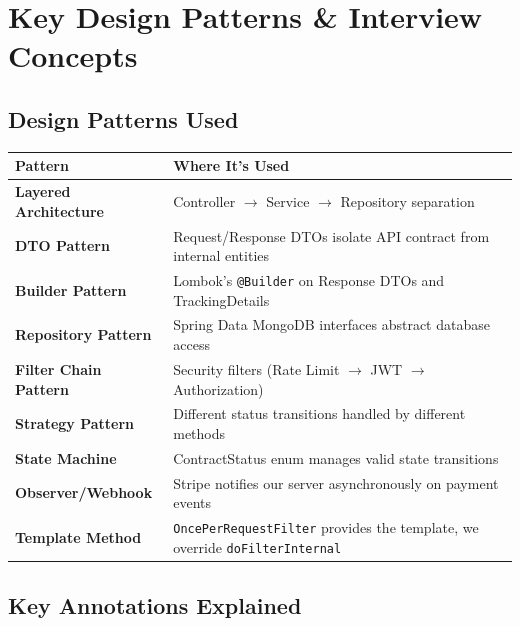 \documentclass[11pt, a4paper]{article}
\begin{document}
\section{Key Design Patterns \& Interview Concepts}

\subsection{Design Patterns Used}

\begin{longtable}{@{}lp{9cm}@{}}
\toprule
\textbf{Pattern} & \textbf{Where It's Used} \\
\midrule
\textbf{Layered Architecture} & Controller $\rightarrow$ Service $\rightarrow$ Repository separation \\
\textbf{DTO Pattern} & Request/Response DTOs isolate API contract from internal entities \\
\textbf{Builder Pattern} & Lombok's \texttt{@Builder} on Response DTOs and TrackingDetails \\
\textbf{Repository Pattern} & Spring Data MongoDB interfaces abstract database access \\
\textbf{Filter Chain Pattern} & Security filters (Rate Limit $\rightarrow$ JWT $\rightarrow$ Authorization) \\
\textbf{Strategy Pattern} & Different status transitions handled by different methods \\
\textbf{State Machine} & ContractStatus enum manages valid state transitions \\
\textbf{Observer/Webhook} & Stripe notifies our server asynchronously on payment events \\
\textbf{Template Method} & \texttt{OncePerRequestFilter} provides the template, we override \texttt{doFilterInternal} \\
\bottomrule
\end{longtable}

\subsection{Key Annotations Explained}
\end{document}
